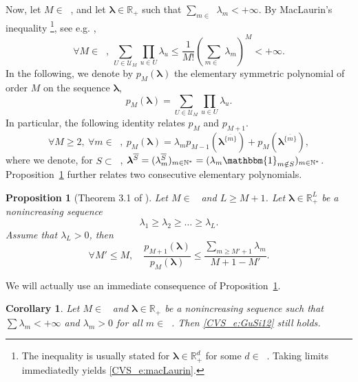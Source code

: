 \documentclass[twoside,11pt]{book}
\newtheorem{corollary}{Corollary}
\newtheorem{proposition}{Proposition}
\numberwithin{theorem}{chapter}
\numberwithin{definition}{chapter}
\numberwithin{proposition}{chapter}
\numberwithin{corollary}{chapter}
\numberwithin{example}{chapter}
\numberwithin{lemma}{chapter}
\numberwithin{assumption}{chapter}
\DeclareMathOperator{\Ns}{\mathbb{N}^{*}}
\def\ind{\mathbbm{1}}
\newcommand{\rb}[1]{\textcolor{magenta}{#1}}
\begin{document}
Now, let $M \in \Ns$, and let $\bm{\lambda} \in \mathbb{R}^{\Ns}_{+}$ such that $\sum_{m \in \Ns} \lambda_{m} < +\infty$. By MacLaurin’s inequality \footnote{The inequality is usually stated for $\bm{\lambda} \in \mathbb{R}^{d}_{+}$ for some $d \in \Ns$. Taking limits immediatedly yields \eqref{CVS_e:macLaurin}.}, see e.g. \citep[Chapter 12]{Ste04},
\begin{equation}
  \label{CVS_e:macLaurin}
\forall M \in \Ns, \: \sum\limits_{U \in \mathcal{U}_{M}} \prod\limits_{u \in U} \lambda_{u} \leq \frac{1}{M!}\left(\sum\limits_{m \in \Ns} \lambda_{m}\right)^{M} < +\infty.
\end{equation}
In the following, we denote by $p_{M}(\bm{\lambda})$ the elementary symmetric polynomial of order $M$ on the sequence $\bm{\lambda}$,
\begin{equation}
p_{M}(\bm{\lambda}) = \sum\limits_{U \in \mathcal{U}_{M}} \prod\limits_{u \in U} \lambda_{u}.
\end{equation}
In particular, the following identity relates $p_M$ and $p_{M+1}$.
\begin{equation}
\forall M \geq 2, \: \forall m \in \Ns, \: p_{M}(\bm{\lambda}) = \lambda_{m} p_{M-1}(\bm{\lambda}^{\overline{\{m\}}}) + p_{M}(\bm{\lambda}^{\overline{\{m\}}}),
\end{equation}
where we denote, for $S \subset \Ns$, $\bm{\lambda}^{\overline{S}} = (\lambda^{\overline{S}}_{m})_{m \in \Ns} = (\lambda_m \ind_{m\notin S})_{m \in \Ns}$. Proposition~\ref{CVS_thm:schur_convex_volume_sampling} further relates two consecutive elementary polynomials.

\begin{proposition}[Theorem 3.1 of \citealp{GuSi12}]\label{CVS_thm:schur_convex_volume_sampling}
Let $M \in \Ns$ and $L \geq M+1$. Let $\bm{\lambda} \in \mathbb{R}_{+}^{L}$ be a nonincreasing sequence
\begin{equation}
\lambda_{1} \geq \lambda_{2} \geq \dots \geq \lambda_{L}.
\end{equation}
Assume that $\lambda_{L} >0$, then
\begin{equation}
  \label{CVS_e:GuSi12}
 \forall M' \leq M, \quad \frac{p_{M+1}(\bm{\lambda})}{p_{M}(\bm{\lambda})} \leq \frac{\sum_{m \geq M'+1} \lambda_{m}}{M+1-M'}.
\end{equation}
\end{proposition}

We will actually use an immediate consequence of Proposition~\ref{CVS_thm:schur_convex_volume_sampling}.
\begin{corollary}\label{CVS_cor:schur_convex_volume_sampling}
Let $M \in \Ns$ and $\bm{\lambda} \in \mathbb{R}_{+}^{\Ns}$ be a nonincreasing sequence such that $\sum \lambda_{m} < +\infty$ and $\lambda_{m} >0$ for all $m \in \Ns$. Then \eqref{CVS_e:GuSi12} still holds.
\end{corollary}
\end{document}
